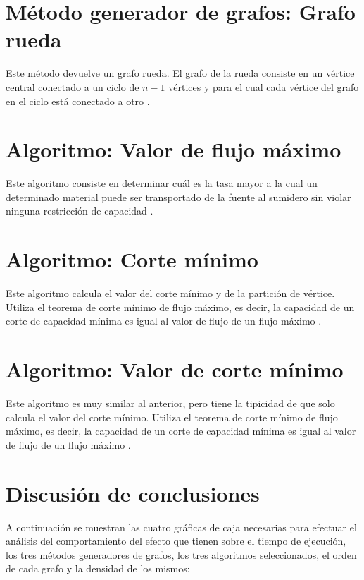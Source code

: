 \documentclass[10pt,a4paper]{article}
\begin{document}
\section{Método generador de grafos: Grafo rueda}

Este método devuelve un grafo rueda. El grafo de la rueda consiste en un vértice central conectado a un ciclo de $n-1$ vértices \cite{a4} y para el cual cada vértice del grafo en el ciclo está conectado a otro \cite{a5}.

\section{Algoritmo: Valor de flujo máximo}

Este algoritmo consiste en determinar cuál es la tasa mayor a la cual un determinado material puede ser transportado de la fuente al sumidero sin violar ninguna restricción de capacidad \cite{a6}.

\section{Algoritmo: Corte mínimo}

Este algoritmo calcula el valor del corte mínimo y de la partición de vértice. Utiliza el teorema de corte mínimo de flujo máximo, es decir, la capacidad de un corte de capacidad mínima es igual al valor de flujo de un flujo máximo \cite{a7}.

\section{Algoritmo: Valor de corte mínimo}

Este algoritmo es muy similar al anterior, pero tiene la tipicidad de que solo calcula el valor del corte mínimo. Utiliza el teorema de corte mínimo de flujo máximo, es decir, la capacidad de un corte de capacidad mínima es igual al valor de flujo de un flujo máximo \cite{a8}.

\section{Discusión de conclusiones}

A continuación se muestran las cuatro gráficas de caja necesarias para efectuar el análisis del comportamiento del efecto que tienen sobre el tiempo de ejecución, los tres métodos generadores de grafos, los tres algoritmos seleccionados, el orden de cada grafo y la densidad de los mismos:
\end{document}
